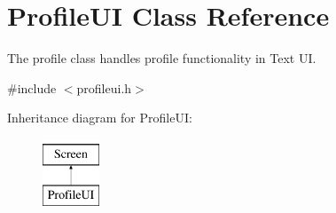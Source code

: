 \hypertarget{classProfileUI}{}\section{Profile\+UI Class Reference}
\label{classProfileUI}


The profile class handles profile functionality in Text UI.  




{\ttfamily \#include $<$profileui.\+h$>$}

Inheritance diagram for Profile\+UI\+:\begin{figure}[H]
\begin{center}
\leavevmode
\includegraphics[height=2.000000cm]{classProfileUI}
\end{center}
\end{figure}
